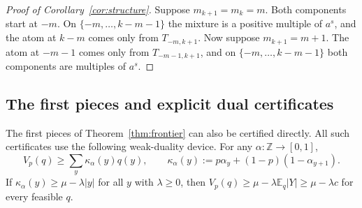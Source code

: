 \documentclass{article}
\theoremstyle{definition}
\theoremstyle{remark}
\newcommand{\Z}{\mathbb{Z}}
\newcommand{\E}{\mathbb{E}}
\begin{document}
\begin{proof}[Proof of Corollary~\ref{cor:structure}]
Suppose \(m_{k+1}=m_k=m\). Both components start at \(-m\). On \(\{-m,\dots,k-m-1\}\) the mixture is a positive multiple of \(a^s\), and the atom at \(k-m\) comes only from \(T_{-m,k+1}\). Now suppose \(m_{k+1}=m+1\). The atom at \(-m-1\) comes only from \(T_{-m-1,k+1}\), and on \(\{-m,\dots,k-m-1\}\) both components are multiples of \(a^s\).
\end{proof}

\subsection{The first pieces and explicit dual certificates}
The first pieces of Theorem~\ref{thm:frontier} can also be certified directly. All such certificates use the following weak-duality device. For any \(\alpha:\Z\to[0,1]\),
\begin{equation}\label{eq:weak}
V_p(q)\ge\sum_y\kappa_\alpha(y)q(y),\qquad\kappa_\alpha(y):=p\alpha_y+(1-p)(1-\alpha_{y+1}).
\end{equation}
If \(\kappa_\alpha(y)\ge\mu-\lambda|y|\) for all \(y\) with \(\lambda\ge0\), then \(V_p(q)\ge\mu-\lambda\E_q|Y|\ge\mu-\lambda c\) for every feasible \(q\).
\end{document}

